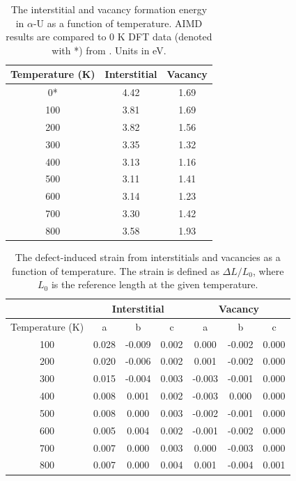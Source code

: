 \documentclass[utf8]{frontiersSCNS} %
\begin{document}
\begin{table}[h]
\caption{The interstitial and vacancy formation energy in $\alpha$-U as a function of temperature. AIMD results are compared to 0 K DFT data (denoted with *) from \cite{wirth2011}. Units in eV.} \label{tab:eform}
\begin{center}
\begin{tabular}{|c|c|c|}
	\hline
	Temperature (K) & Interstitial & Vacancy \\
	 \hline
0* & 4.42 & 1.69 \\
100 &	3.81 &	1.69 \\
200 &	3.82 &	1.56 \\
300 &	3.35 &	1.32 \\
400 &	3.13 &	1.16 \\
500 &	3.11 &	1.41 \\
600 &	3.14 &	1.23 \\
700 &	3.30 & 1.42 \\
800 &	3.58 &	1.93 \\
	 \hline
\end{tabular}
\end{center}
\label{default}
\end{table}

\begin{table}[h]
\caption{The defect-induced strain from interstitials and vacancies as a function of temperature. The strain is defined as $\Delta L/L_0$, where $L_0$ is the reference length at the given temperature. } \label{tab:strain}
\begin{center}
\begin{tabular}{|c|c|c|c|c|c|c|}
	\hline
	& \multicolumn{3}{c|}{Interstitial} & \multicolumn{3}{c|}{Vacancy} \\
	 \hline
Temperature (K)  &	a	& b	& c & a & b & c \\
\hline
100	&0.028	&-0.009	&0.002&		0.000	&-0.002	&0.000 \\
200	&0.020	&-0.006	&0.002&		0.001	&-0.002	&0.000 \\
300	&0.015	&-0.004	&0.003&		-0.003	&-0.001	&0.000 \\
400	&0.008	&0.001	&0.002&		-0.003	&0.000	&0.000 \\
500	&0.008	&0.000	&0.003&		-0.002	&-0.001	&0.000 \\
600	&0.005	&0.004	&0.002&		-0.001	&-0.002	&0.000 \\
700	&0.007	&0.000	&0.003&		0.000	&-0.003	&0.000 \\
800	&0.007	&0.000	&0.004&		0.001	&-0.004	&0.001 \\
	 \hline
\end{tabular}
\end{center}
\label{default}
\end{table}

\FloatBarrier

 

\end{document}
